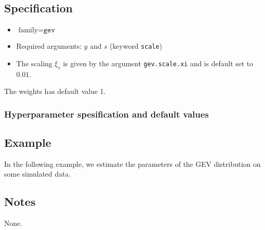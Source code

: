 \documentclass[a4paper,11pt]{article}
\begin{document}
\subsection*{Specification}

\begin{itemize}
\item $\text{family}=\texttt{gev}$
\item Required arguments: $y$ and $s$ (keyword \texttt{scale})
\item The scaling $\xi_{s}$ is given by the argument
    \texttt{gev.scale.xi} and is default set to $0.01$.
\end{itemize}
The weights has default value 1.

\subsubsection*{Hyperparameter spesification and default values}


\subsection*{Example}

In the following example, we estimate the parameters of the GEV
distribution on some simulated data.


\subsection*{Notes}

None.
\end{document}
